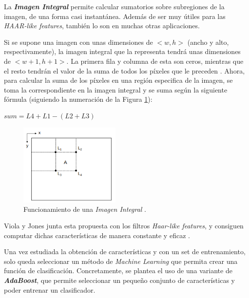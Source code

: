 La \textbf{\textit{Imagen Integral}} permite calcular sumatorios sobre subregiones de la imagen, de una forma casi instantánea. Además de ser muy útiles para las \textit{HAAR-like features}, también lo son en muchas otras aplicaciones.

Si se supone una imagen con unas dimensiones de $<w,h>$ (ancho y alto, respectivamente), la imagen integral que la representa tendrá unas dimensiones de $<w+1,h+1>$. La primera fila y columna de esta son ceros, mientras que el resto tendrán el valor de la suma de todos los píxeles que le preceden \cite{integral-web}. Ahora, para calcular la suma de los píxeles en una región especifica de la imagen, se toma la correspondiente en la imagen integral y se suma según la siguiente fórmula (siguiendo la numeración de la Figura \ref{fig:integral}):
\begin{center}
	$sum = L4 + L1 - (L2 + L3)$ 
\end{center}
\begin{figure}[htp]
	\centering
	\includegraphics[width=5cm]{imagenes/integral.png}
	\caption{Funcionamiento de una \textit{Imagen Integral} \cite{integral-web}.}
	\label{fig:integral}
\end{figure}

Viola y Jones junta esta propuesta con los filtros \textit{Haar-like features}, y consiguen computar dichas características de manera constante y eficaz \cite{integral}.


%
Una vez estudiada la obtención de características y con un set de entrenamiento, solo queda seleccionar un método de \textit{Machine Learning} que permita crear una función de clasificación. Concretamente, se plantea el uso de una variante de \textbf{\textit{AdaBoost}}, que permite seleccionar un pequeño conjunto de características y poder entrenar un clasificador. 

